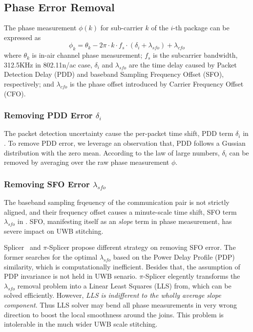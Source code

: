 
\subsection{Phase Error Removal} %
\label{sub:signal_model}

The phase measurement $\phi(k)$ for sub-carrier $k$ of the $i$-th package can be expressed as
\begin{equation}
\label{eq:phase_equation}
	\phi_k = \theta_k - 2\pi\cdot k\cdot f_s\cdot(\delta_i + \lambda_{sfo}) + \lambda_{cfo}
\end{equation}
where $\theta_k$ is in-air channel phase measurement; $f_s$ is the subcarrier bandwidth, \ie 312.5KHz in 802.11n/ac case, $\delta_i$ and $\lambda_{sfo}$ are the time delay caused by Packet Detection Delay (PDD) and baseband Sampling Frequency Offset (SFO), respectively; and $\lambda_{cfo}$ is the phase offset introduced by Carrier Frequency Offset (CFO).

\subsubsection{Removing PDD Error $\delta_i$} %
\label{ssub:removing_pdd}
The packet detection uncertainty cause the per-packet time shift, \ie PDD term $\delta_i$ in . To remove PDD error, we leverage an observation that, PDD follows a Gussian distribution with the zero mean\cite{Speth1999Optimum}. According to the law of large numbers, $\delta_i$ can be removed by averaging over the raw phase measurement $\phi$.

\subsubsection{Removing SFO Error $\lambda_{sfo}$} %
\label{ssub:removing_sfo}

The baseband sampling frqeuency of the communication pair is not strictly aligned, 
and their frequency offset causes a minute-scale time shift, 
\ie SFO term $\lambda_{sfo}$ in . 
SFO, manifesting itself as an \textit{slope} term in phase measurement, 
has severe impact on UWB stitching.

Splicer~\cite{Xie2015Precise} and $\pi$-Splicer\cite{Zhu:2018fc} 
propose different strategy on removing SFO error. 
The former searches for the optimal $\lambda_{sfo}$ 
based on the Power Delay Profile (PDP) similarity, 
which is computationally inefficient. 
Besides that, the assumption of PDP invariance is not held in UWB senario. 
$\pi$-Splicer\cite{Zhu:2018fc} elegently transforms the $\lambda_{sfo}$ removal problem
into a Linear Least Squares (LLS) from, 
which can be solved efficiently.
However, 
\textit{LLS is indifferent to the wholly average slope component}.
Thus LLS solver may bend all phase measurements in very wrong direction
to boost the local smoothness around the joins.
This problem is intolerable in the much wider UWB scale stitching.

